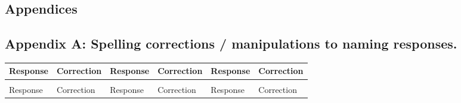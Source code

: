 \documentclass[
  11pt,
]{article}
\begin{document}
\newpage
\begin{landscape}

\hypertarget{appendices}{%
\section{Appendices}\label{appendices}}

\hypertarget{appendix-a-spelling-corrections-manipulations-to-naming-responses.}{%
\subsection{Appendix A: Spelling corrections / manipulations to naming
responses.}\label{appendix-a-spelling-corrections-manipulations-to-naming-responses.}}

\begingroup\fontsize{7}{9}\selectfont

\begin{longtable}{>{\raggedright\arraybackslash}p{2.6cm}>{\raggedright\arraybackslash}p{2.3cm}|>{\raggedright\arraybackslash}p{2.6cm}>{\raggedright\arraybackslash}p{2.3cm}|>{\raggedright\arraybackslash}p{2.6cm}>{\raggedright\arraybackslash}p{2.6cm}}
\toprule
Response & Correction & Response  & Correction  & Response   & Correction  \\
\midrule
\endfirsthead
\multicolumn{6}{@{}l}{\textit{(continued)}}\\
\toprule
Response & Correction & Response  & Correction  & Response   & Correction  \\
\midrule
\endhead


\end{longtable}
\end{landscape}
\end{document}

